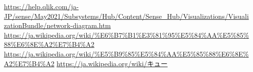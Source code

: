 \documentclass[a4j, titlepage]{jarticle}
\begin{document}
\begin{thebibliography}{99}
\url{https://help.qlik.com/ja-JP/sense/May2021/Subsystems/Hub/Content/Sense_Hub/Visualizations/VisualizationBundle/network-diagram.htm}
\url{https://ja.wikipedia.org/wiki/%E6%B7%B1%E3%81%95%E5%84%AA%E5%85%88%E6%8E%A2%E7%B4%A2}
\url{https://ja.wikipedia.org/wiki/%E5%B9%85%E5%84%AA%E5%85%88%E6%8E%A2%E7%B4%A2}
\url{https://ja.wikipedia.org/wiki/キュー}

\end{thebibliography} 
\end{document}
